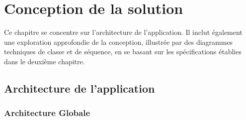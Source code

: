 \chapter{Conception de la solution}
\label{Conception de la solution}

Ce chapitre se concentre sur l'architecture de l'application. Il inclut également une exploration approfondie de la conception, illustrée par des diagrammes techniques de classe et de séquence, en se basant sur les spécifications établies dans le deuxième chapitre.
\newpage

\section{Architecture de l'application}
\subsection{Architecture Globale}

